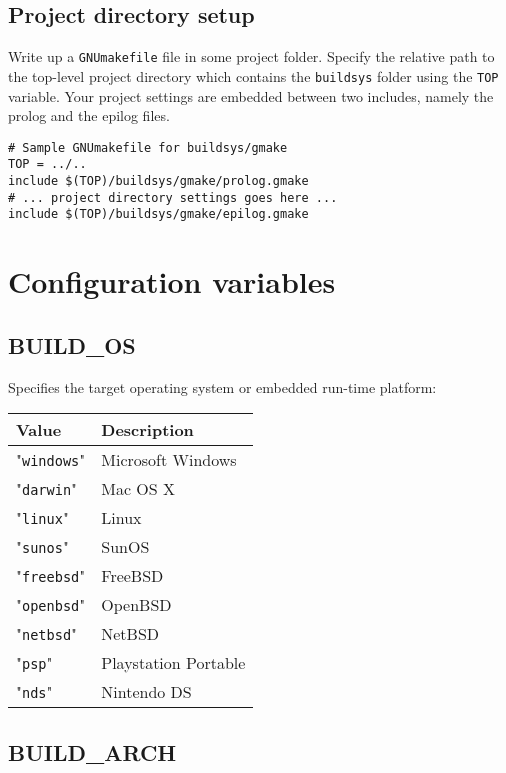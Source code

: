 \documentclass{article}
\newcommand{\var}[1]{{\tt #1}}
\newcommand{\val}[1]{"{\tt #1}"}
\newcommand{\file}[1]{{\tt #1}}
\begin{document}
\subsection{Project directory setup}

Write up a \file{GNUmakefile} file in some project folder. Specify the
relative path to the top-level project directory which contains the \file{buildsys} folder
using the \var{TOP} variable. Your project settings are embedded between
two includes, namely the prolog and the epilog files.

\begin{verbatim}
# Sample GNUmakefile for buildsys/gmake
TOP	= ../..
include $(TOP)/buildsys/gmake/prolog.gmake
# ... project directory settings goes here ...
include $(TOP)/buildsys/gmake/epilog.gmake
\end{verbatim}

\pagebreak
\section{Configuration variables}
  
\subsection{BUILD\_OS}

Specifies the target operating system or embedded run-time platform:

\begin{tabular}{ll}
Value         & Description           \\
\hline
\val{windows} & Microsoft Windows     \\
\val{darwin}  & Mac OS X              \\
\val{linux}   & Linux                 \\
\val{sunos}   & SunOS                 \\
\val{freebsd} & FreeBSD		      \\
\val{openbsd} & OpenBSD		      \\
\val{netbsd}  & NetBSD		      \\
\val{psp}     & Playstation Portable  \\
\val{nds}     & Nintendo DS           \\
\end{tabular}

\subsection{BUILD\_ARCH}
\end{document}
